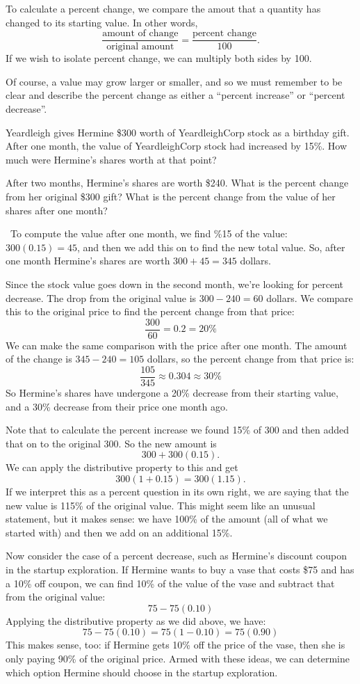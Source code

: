To calculate a percent change, we compare the amout that a quantity has changed to its starting value. In other words, 
\[\frac{\text{amount of change}}{\text{original amount}} = \frac{\text{percent change}}{100}.\]
If we wish to isolate percent change, we can multiply both sides by 100.

Of course, a value may grow larger or smaller, and so we must remember to be clear and describe the percent change as either a ``percent increase'' or ``percent decrease''.

\begin{boxex}
Yeardleigh gives Hermine \$300 worth of YeardleighCorp stock as a birthday gift. After one month, the value of YeardleighCorp stock had increased by 15\%. How much were Hermine's shares worth at that point?

After two months, Hermine's shares are worth \$240. What is the percent change from her original \$300 gift? What is the percent change from the value of her shares after one month?

\exsoln\ To compute the value after one month, we find \%15 of the value: $300(0.15) = 45$, and then we add this on to find the new total value. So, after one month Hermine's shares are worth $300 + 45 = 345$ dollars.

Since the stock value goes down in the second month, we're looking for percent decrease. The drop from the original value is $300-240=60$ dollars. We compare this to the original price to find the percent change from that price: \[\frac{300}{60} = 0.2 = 20\%\]
We can make the same comparison with the price after one month. The amount of the change is $345-240=105$ dollars, so the percent change from that price is: \[\frac{105}{345} \approx 0.304 \approx 30\%\]
So Hermine's shares have undergone a 20\% decrease from their starting value, and a 30\% decrease from their price one month ago.
\end{boxex}

Note that to calculate the percent increase we found 15\% of 300 and then added that on to the original 300. So the new amount is \[300 + 300(0.15).\] We can apply the distributive property to this and get \[300(1+0.15) = 300(1.15).\] If we interpret this as a percent question in its own right, we are saying that the new value is 115\% of the original value. This might seem like an unusual statement, but it makes sense: we have 100\% of the amount (all of what we started with) and then we add on an additional 15\%.

Now consider the case of a percent decrease, such as Hermine's discount coupon in the startup exploration. If Hermine wants to buy a vase that costs \$75 and has a 10\% off coupon, we can find 10\% of the value of the vase and subtract that from the original value: \[75 - 75(0.10)\] Applying the distributive property as we did above, we have: \[75 - 75(0.10) = 75(1-0.10) = 75(0.90)\] This makes sense, too: if Hermine gets 10\% off the price of the vase, then she is only paying 90\% of the original price. Armed with these ideas, we can determine which option Hermine should choose in the startup exploration.

